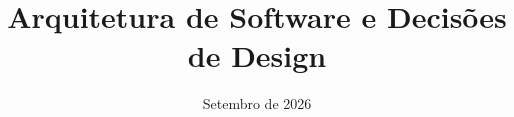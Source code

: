 \documentclass[individual]{modern-engsoft}
\title{Arquitetura de Software e Decisões de Design}
\date{Setembro de 2026}
\begin{document}
\imprimircapa

\tableofcontents
\newpage

%
%
%

%
%
%



\end{document}
